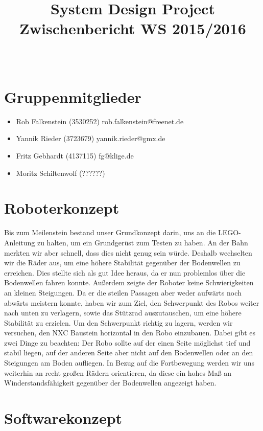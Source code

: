 \documentclass[11pt,a4paper]{article}
\title{
  \Huge System Design Project \\
  \LARGE Zwischenbericht WS 2015/2016
}
\author{
  \Large \todo{Der fühlende Psi Bot \#14}\\
}
\begin{document}
\maketitle

\section{Gruppenmitglieder}
\begin{itemize}
  \item {Rob Falkenstein (3530252) rob.falkenstein@freenet.de}
	\item	{Yannik Rieder (3723679) yannik.rieder@gmx.de}
	\item	{Fritz Gebhardt (4137115) fg@klige.de}
	\item	{Moritz Schiltenwolf (??????)}
\end{itemize}

\section{Roboterkonzept}

Bis zum Meilenstein bestand unser Grundkonzept darin, uns an die LEGO-Anleitung zu halten, um ein Grundgerüst zum Testen zu haben. 
An der Bahn merkten wir aber schnell, dass dies nicht genug sein würde. Deshalb wechselten wir die Räder aus, um eine höhere Stabilität 
gegenüber der Bodenwellen zu erreichen. Dies stellte sich als gut Idee heraus, da er nun problemlos über die Bodenwellen fahren konnte.
Außerdem zeigte der Roboter keine Schwierigkeiten an kleinen Steigungen. Da er die steilen Passagen aber weder aufwärts noch abwärts
meistern konnte, haben wir zum Ziel, den Schwerpunkt des Robos weiter nach unten zu verlagern, sowie das Stützrad auszutauschen, um eine
höhere Stabilität zu erzielen. Um den Schwerpunkt richtig zu lagern, werden wir versuchen, den NXC Baustein horizontal in den Robo
einzubauen. Dabei gibt es zwei Dinge zu beachten: Der Robo sollte auf der einen Seite möglichst tief und stabil liegen, auf der anderen Seite
aber nicht auf den Bodenwellen oder an den Steigungen am Boden aufliegen. 
In Bezug auf die Fortbewegung werden wir uns weiterhin an recht großen Rädern orientieren, da diese ein hohes Maß an Winderstandsfähigkeit
gegenüber der Bodenwellen angezeigt haben.

\section{Softwarekonzept}
\end{document}
